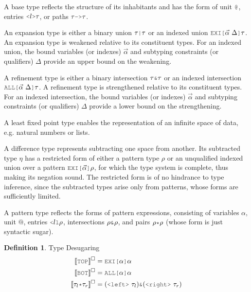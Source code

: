 \documentclass[acmsmall]{acmart}
\theoremstyle{definition}
\newtheorem{definition}{Definition}[section]
\begin{document}
A base type reflects the structure of its inhabitants and has the form of unit $\J{@}$, 
entries $\J{<}l\J{>}\tau$, or paths $\tau \J{->} \tau$.

An expansion type is either a binary union $\tau \J{|} \tau$ or 
an indexed union $\J{EXI[}\vec{\alpha}\ \Delta\J{]}\tau$.
An expansion type is weakened relative to its constituent types. 
For an indexed union, the bound variables (or indexes) $\vec{\alpha}$ 
and subtyping constraints (or qualifiers) $\Delta$
provide an upper bound on the weakening. 

A refinement type is either a binary intersection $\tau \J{\&} \tau$ or 
an indexed intersection $\J{ALL[} \vec{\alpha}\ \Delta \J{]}\tau$.
A refinement type is strengthened relative to its constituent types. 
For an indexed intersection, the bound variables (or indexes) $\vec{\alpha}$ 
and subtyping constraints (or qualifiers) $\Delta$
provide a lower bound on the strengthening. 

A least fixed point type enables the representation of an infinite space of data,
e.g. natural numbers or lists. 

A difference type represents subtracting one space from another.
Its subtracted type $\eta$ has a restricted form of either
a pattern type $\rho$ or an unqualified indexed union 
over a pattern $\J{EXI[}\vec{\alpha} \J{]} \rho$, for which the type system
is complete, thus making its negation sound.  
The restricted form is of no hindrance to type inference, since the 
subtracted types arise only from patterns, whose forms are sufficiently
limited.

A pattern type reflects the forms of pattern expressions, consisting of 
variables $\alpha$, unit $@$, entries $\J{<} l \J{l} \rho$, intersections $\rho \J{\&} \rho$,
and pairs $\rho \J{*} \rho$ (whose form is just syntactic sugar).


\hfill
\begin{definition} 
  \label{def:type_desugaring}
  Type Desugaring 
  \hfill 
  \boxed{\llbracket \gamma \rrbracket^\square = \tau}
  \\
  \begin{align*}
    \llbracket \J{TOP} \rrbracket^\square &= \J{EXI[} \alpha \J{]} \alpha
    \\
    \llbracket \J{BOT} \rrbracket^\square &= \J{ALL[} \alpha \J{]} \alpha
    \\
    \llbracket \tau_l \J{*} \tau_r \rrbracket^\square &= (\J{<left>}\ \tau_l)  \J{\&} (\J{<right>}\ \tau_r)
  \end{align*}
\end{definition} 
\hfill
\end{document}
